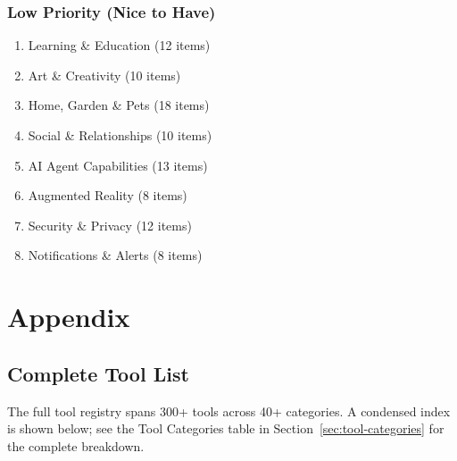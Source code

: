 \documentclass[12pt,a4paper,twoside]{report}
\begin{document}
\subsection{Low Priority (Nice to Have)}

\begin{enumerate}[leftmargin=*, start=19]
    \item Learning \& Education (12 items)
    \item Art \& Creativity (10 items)
    \item Home, Garden \& Pets (18 items)
    \item Social \& Relationships (10 items)
    \item AI Agent Capabilities (13 items)
    \item Augmented Reality (8 items)
    \item Security \& Privacy (12 items)
    \item Notifications \& Alerts (8 items)
\end{enumerate}

\chapter{Appendix}

\section{Complete Tool List}

The full tool registry spans 300+ tools across 40+ categories. A condensed index is shown below; see the Tool Categories table in Section~\ref{sec:tool-categories} for the complete breakdown.
\end{document}
